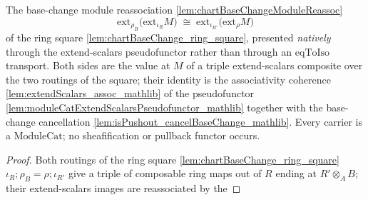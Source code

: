 \begin{lemma}
  \label{lem:chartBaseChange_extendScalars_cocycle}
  The base-change module reassociation \cref{lem:chartBaseChangeModuleReassoc}
  \[
    \mathrm{ext}_{\rho_B}\bigl(\mathrm{ext}_{\iota_R} M\bigr)
      \;\cong\;
    \mathrm{ext}_{\iota_{R'}}\bigl(\mathrm{ext}_{\rho} M\bigr)
  \]
  of the ring square \cref{lem:chartBaseChange_ring_square}, presented \emph{natively} through the
  extend-scalars pseudofunctor rather than through an \(\mathrm{eqToIso}\) transport. Both sides are
  the value at \(M\) of a triple extend-scalars composite over the two routings of the square; their
  identity is the associativity coherence \cref{lem:extendScalars_assoc_mathlib} of the pseudofunctor
  \cref{lem:moduleCatExtendScalarsPseudofunctor_mathlib} together with the base-change cancellation
  \cref{lem:isPushout_cancelBaseChange_mathlib}. Every carrier is a \(\mathrm{ModuleCat}\); no
  sheafification or pullback functor occurs.
  \begin{proof}
    Both routings of the ring square \cref{lem:chartBaseChange_ring_square}
    \(\iota_R \mathbin{;}\rho_B = \rho\mathbin{;}\iota_{R'}\) give a triple of composable ring maps
    out of \(R\) ending at \(R'\otimes_A B\); their extend-scalars images are reassociated by the

\end{proof}
\end{lemma}

